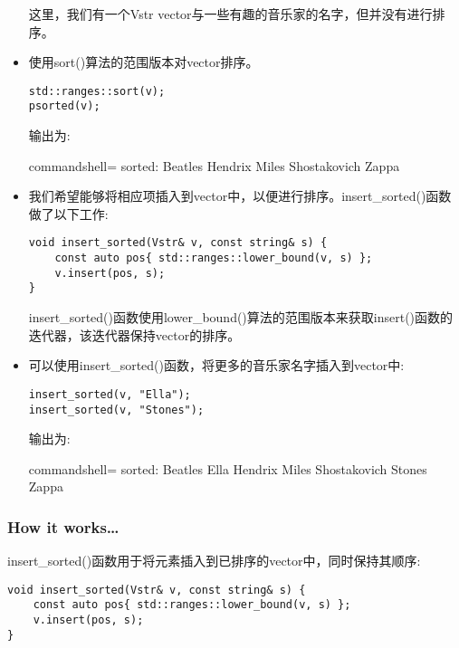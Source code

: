 \begin{itemize}
这里，我们有一个Vstr vector与一些有趣的音乐家的名字，但并没有进行排序。

\item 
使用sort()算法的范围版本对vector排序。

\begin{lstlisting}[style=styleCXX]
std::ranges::sort(v);
psorted(v);
\end{lstlisting}

输出为:

\begin{tcblisting}{commandshell={}}
sorted: Beatles Hendrix Miles Shostakovich Zappa
\end{tcblisting}

\item 
我们希望能够将相应项插入到vector中，以便进行排序。insert\_sorted()函数做了以下工作:

\begin{lstlisting}[style=styleCXX]
void insert_sorted(Vstr& v, const string& s) {
	const auto pos{ std::ranges::lower_bound(v, s) };
	v.insert(pos, s);
}
\end{lstlisting}

insert\_sorted()函数使用lower\_bound()算法的范围版本来获取insert()函数的迭代器，该迭代器保持vector的排序。

\item 
可以使用insert\_sorted()函数，将更多的音乐家名字插入到vector中:

\begin{lstlisting}[style=styleCXX]
insert_sorted(v, "Ella");
insert_sorted(v, "Stones");
\end{lstlisting}

输出为:

\begin{tcblisting}{commandshell={}}
sorted: Beatles Ella Hendrix Miles Shostakovich Stones Zappa
\end{tcblisting}
\end{itemize}

\subsubsection{How it works…}

insert\_sorted()函数用于将元素插入到已排序的vector中，同时保持其顺序:

\begin{lstlisting}[style=styleCXX]
void insert_sorted(Vstr& v, const string& s) {
	const auto pos{ std::ranges::lower_bound(v, s) };
	v.insert(pos, s);
}
\end{lstlisting}

